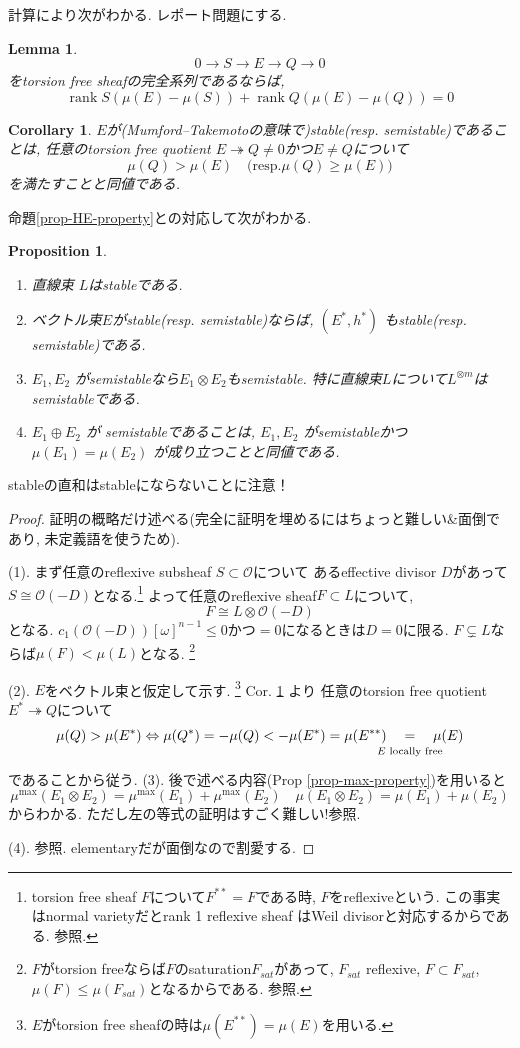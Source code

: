 \documentclass[dvipdfmx,a4paper,11pt]{article} %
\newtheorem{cor}[thm]{Corollary}
\newtheorem{prop}[thm]{Proposition}
\newtheorem{lem}[thm]{Lemma}
\theoremstyle{definition}
\theoremstyle{remark}
\numberwithin{equation}{section}
\newcommand{\underalign}[2]{\quad \underset{\mathclap{\strut #1}}{#2}\quad}
\begin{document}
計算により次がわかる. レポート問題にする. 
\begin{lem}
\[
0\longrightarrow S\longrightarrow E\longrightarrow Q\longrightarrow 0
\]
をtorsion free sheafの完全系列であるならば,
\[
\operatorname{rank} S (\mu(E)-\mu(S))+\operatorname{rank} Q(\mu(E)-\mu(Q))=0
\]
\end{lem}
\begin{cor}
\label{cor-stable-equiv}
$E$が(Mumford--Takemotoの意味で)stable(resp. semistable)であることは, 
任意のtorsion free quotient $E \twoheadrightarrow Q\neq0$かつ$E \neq Q$について
$$
\mu(Q) >\mu(E)
\quad\text{(resp.
$\mu(Q) \ge \mu(E)$
)}
$$
を満たすことと同値である. 
\end{cor}

命題\ref{prop-HE-property}との対応して次がわかる. 
\begin{prop}
\begin{enumerate}
\item[(1)]  直線束 $L$はstableである.
\item[(2)] ベクトル束$E$がstable(resp. semistable)ならば, $(E^*,h^*)$ もstable(resp. semistable)である.
\item[(3)] 
$E_1,E_2$ がsemistableなら$E_1\otimes E_2$もsemistable. 特に直線束$L$について$L^{\otimes m}$はsemistableである. 
\item[(4)] 
 $E_1\oplus E_2$ が semistableであることは, $E_1,E_2$ がsemistableかつ
 $\mu(E_1)=\mu(E_2)$ が成り立つことと同値である. 
\end{enumerate}
\end{prop}
stableの直和はstableにならないことに注意！
\begin{proof}
証明の概略だけ述べる(完全に証明を埋めるにはちょっと難しい\&面倒であり, 未定義語を使うため).

(1). まず任意のreflexive subsheaf $S \subset \mathcal{O}$について
あるeffective divisor $D$があって$S \cong \mathcal{O}(-D)$となる.\footnote{torsion free sheaf $F$について$F^{**}=F$である時, $F$をreflexiveという. この事実はnormal varietyだとrank 1 reflexive sheaf はWeil divisorと対応するからである. \cite{Har80}参照.}
よって任意のreflexive sheaf$F \subset L$について, 
$$
F \cong L \otimes \mathcal{O}(-D)
$$
となる. 
$c_1(\mathcal{O}(-D))[\omega]^{n-1} \le 0 $かつ$=0$になるときは$D=0$に限る. 
$F \subsetneq L$ならば$\mu(F) < \mu(L)$となる. 
\footnote{$F$がtorsion freeならば$F$のsaturation$F_{sat}$があって, $F_{sat}$ reflexive, $F \subset F_{sat}$, $\mu(F) \le \mu(F_{sat})$となるからである. \cite[2章]{Lazicnote}参照.}

(2). $E$をベクトル束と仮定して示す. \footnote{$E$がtorsion free sheafの時は$\mu(E^{**})=\mu(E)$を用いる.}
Cor. \ref{cor-stable-equiv}
より
任意のtorsion free quotient $E^* \twoheadrightarrow Q$について
$$
\mu(Q) > \mu(E^{*})
\Leftrightarrow
\mu(Q^{*})=- \mu(Q) <-\mu(E^{*})=\mu(E^{**})
\underalign{\text{$E$ locally free}}{=}\mu(E)
$$
であることから従う. 
(3). 後で述べる内容(Prop \ref{prop-max-property})を用いると
$$
\mu^{\max}(E_1\otimes E_2)
=\mu^{\max}(E_1)+ \mu^{\max}(E_2)
\quad 
\mu(E_1\otimes E_2) = 
\mu(E_1) + \mu(E_2)  
$$
からわかる. ただし左の等式の証明はすごく難しい!\cite[2章]{Lazicnote}参照.
 
 (4). \cite[Proposition 5.7.9]{Kob14}参照. elementaryだが面倒なので割愛する.
\end{proof}
\end{document}
